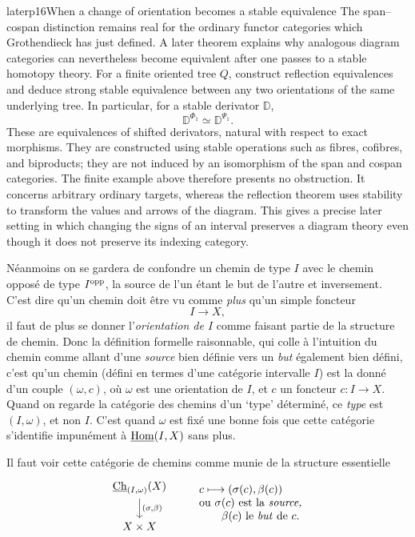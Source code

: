 \begin{dcomment}{later}{p16}{When a change of orientation becomes a stable equivalence}
The span--cospan distinction remains real for the ordinary functor categories which Grothendieck has just defined. A later theorem explains why analogous diagram categories can nevertheless become equivalent after one passes to a stable homotopy theory. For a finite oriented tree $Q$, \citet[Theorem~9.19 and Corollary~9.23, arXiv v3]{GrothStovicek2016Trees} construct reflection equivalences and deduce strong stable equivalence between any two orientations of the same underlying tree. In particular, for a stable derivator $\mathbb D$,
\[
 \mathbb D^{\Phi_1}\simeq\mathbb D^{\Psi_1}.
\]
These are equivalences of shifted derivators, natural with respect to exact morphisms. They are constructed using stable operations such as fibres, cofibres, and biproducts; they are not induced by an isomorphism of the span and cospan categories. The finite example above therefore presents no obstruction. It concerns arbitrary ordinary targets, whereas the reflection theorem uses stability to transform the values and arrows of the diagram. This gives a precise later setting in which changing the signs of an interval preserves a diagram theory even though it does not preserve its indexing category.
\end{dcomment}


Néanmoins on se gardera de confondre un chemin de type $I$ avec le chemin opposé de type $I^{\mathrm{opp}}$, la source de l'un étant le but de l'autre et inversement. C'est dire qu'un chemin doit être vu comme \textit{plus} qu'un simple foncteur
\[
I \longrightarrow X,
\]
il faut de plus se donner l'\textit{orientation de $I$} comme faisant partie de la structure de chemin. Donc la définition formelle raisonnable, qui colle à l'intuition du chemin comme allant d'une \textit{source} bien définie vers un \textit{but} également bien défini, c'est qu'un chemin (défini en termes d'une catégorie intervalle $I$) est la donné d'un couple $(\omega,c)$, où $\omega$ est une orientation de $I$, et $c$ un foncteur $c : I \longrightarrow X$. Quand on regarde la catégorie des chemins d'un `type' déterminé, ce \textit{type} est $(I,\omega)$, et non $I$. C'est quand $\omega$ est fixé une bonne fois que cette catégorie s'identifie impunément à $\underline{\mathrm{Hom}}(I,X)$ sans plus. %

Il faut voir cette catégorie de chemins comme munie de la structure essentielle
\[
\begin{tikzcd}
\Ch_{(I,\omega)}(X) \arrow[d, "{(\sigma,\beta)}"] \\
X \times X
\end{tikzcd}
\qquad
\begin{array}{l}
c \longmapsto (\sigma(c),\beta(c)) \\
\text{ou $\sigma(c)$ est la \textit{source,}} \\
\qquad \text{$\beta(c)$ le \textit{but} de $c$.}
\end{array} %
\]

